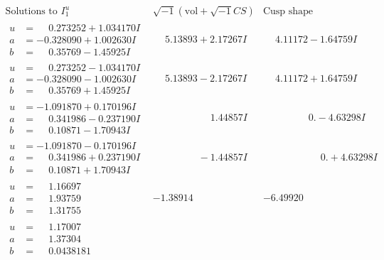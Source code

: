 \documentclass[1p]{elsarticle_modified}
\theoremstyle{definition}
\newcommand{\I}{\sqrt{-1}}
\begin{document}
$$\begin{array}{c|c|c}  
\text{Solutions to }I^u_{1}& \I (\text{vol} + \sqrt{-1}CS) & \text{Cusp shape}\\
 \hline 
\begin{aligned}
u &= \phantom{-}0.273252 + 1.034170 I \\
a &= -0.328090 + 1.002630 I \\
b &= \phantom{-}0.35769 - 1.45925 I\end{aligned}
 & \phantom{-}5.13893 + 2.17267 I & \phantom{-}4.11172 - 1.64759 I \\ \hline\begin{aligned}
u &= \phantom{-}0.273252 - 1.034170 I \\
a &= -0.328090 - 1.002630 I \\
b &= \phantom{-}0.35769 + 1.45925 I\end{aligned}
 & \phantom{-}5.13893 - 2.17267 I & \phantom{-}4.11172 + 1.64759 I \\ \hline\begin{aligned}
u &= -1.091870 + 0.170196 I \\
a &= \phantom{-}0.341986 - 0.237190 I \\
b &= \phantom{-}0.10871 - 1.70943 I\end{aligned}
 & \phantom{-0.000000 -}1.44857 I & \phantom{-0.000000 } 0. - 4.63298 I \\ \hline\begin{aligned}
u &= -1.091870 - 0.170196 I \\
a &= \phantom{-}0.341986 + 0.237190 I \\
b &= \phantom{-}0.10871 + 1.70943 I\end{aligned}
 & \phantom{-0.000000 } -1.44857 I & \phantom{-0.000000 -}0. + 4.63298 I \\ \hline\begin{aligned}
u &= \phantom{-}1.16697\phantom{ +0.000000I} \\
a &= \phantom{-}1.93759\phantom{ +0.000000I} \\
b &= \phantom{-}1.31755\phantom{ +0.000000I}\end{aligned}
 & -1.38914\phantom{ +0.000000I} & -6.49920\phantom{ +0.000000I} \\ \hline\begin{aligned}
u &= \phantom{-}1.17007\phantom{ +0.000000I} \\
a &= \phantom{-}1.37304\phantom{ +0.000000I} \\
b &= \phantom{-}0.0438181\phantom{ +0.000000I}\end{aligned}

\end{array}$$
\end{document}
